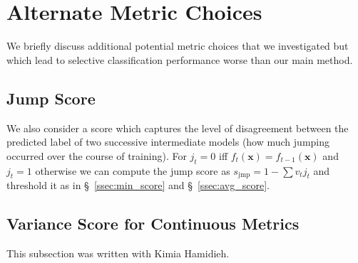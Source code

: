 \section{Alternate Metric Choices}
\label{sec:alt_scores}

We briefly discuss additional potential metric choices that we investigated but which lead to selective classification performance worse than our main method.


\subsection{Jump Score \sjmp} We also consider a score which captures the level of disagreement between the predicted label of two successive intermediate models (\ie how much jumping occurred over the course of training). For $j_t = 0$ iff $f_{t}(\bm{x}) = f_{t-1}(\bm{x})$ and $j_t = 1$ otherwise we can compute the jump score as $s_\text{jmp} = 1 - \sum v_t j_t$ and threshold it as in \S~\ref{ssec:min_score} and \S~\ref{ssec:avg_score}. 

\subsection{Variance Score \svar for Continuous Metrics}

\begin{contriback}
This subsection was written with Kimia Hamidieh.
\end{contriback}

